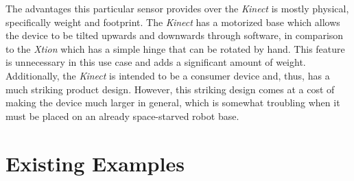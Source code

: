 The advantages this particular sensor provides over the \emph{Kinect} is mostly physical, specifically weight and footprint. The \emph{Kinect} has a motorized base which allows the device to be tilted upwards and downwards through software, in comparison to the \emph{Xtion} which has a simple hinge that can be rotated by hand. This feature is unnecessary in this use case and adds a significant amount of weight. Additionally, the \emph{Kinect} is intended to be a consumer device and, thus, has a much striking product design. However, this striking design comes at a cost of making the device much larger in general, which is somewhat troubling when it must be placed on an already space-starved robot base.


\section{Existing Examples}